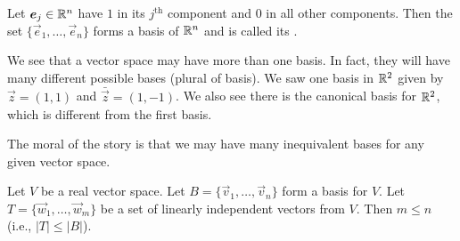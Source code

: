 \begin{example}
Let $\boldsymbol{e}_{j}\in\mathbb{R}^{n}$ have $1$ in its $j^{\text{th}}$ component
and $0$ in all other components. Then the set
$\{\vec{e}_{1},\dots,\vec{e}_{n}\}$ forms a basis of $\mathbb{R}^{n}$ and is
called its .
\end{example}

We see that a vector space may have more than one basis. In fact, they
will have many different possible bases (plural of basis). We saw one
basis in $\mathbb{R}^{2}$ given by $\vec{z}=(1,1)$ and
$\bar{\vec{z}}=(1,-1)$. We also see there is the canonical basis for
$\mathbb{R}^{2}$, which is different from the first basis.

The moral of the story is that we may have many inequivalent bases for
any given vector space.

\begin{lemma}
Let $V$ be a real vector space.
Let $B=\{\vec{v}_{1},\dots,\vec{v}_{n}\}$ form a basis for $V$.
Let $T=\{\vec{w}_{1},\dots,\vec{w}_{m}\}$ be a set of linearly
independent vectors from $V$.
Then $m\leq n$ (i.e., $|T|\leq|B|$).
\end{lemma}

